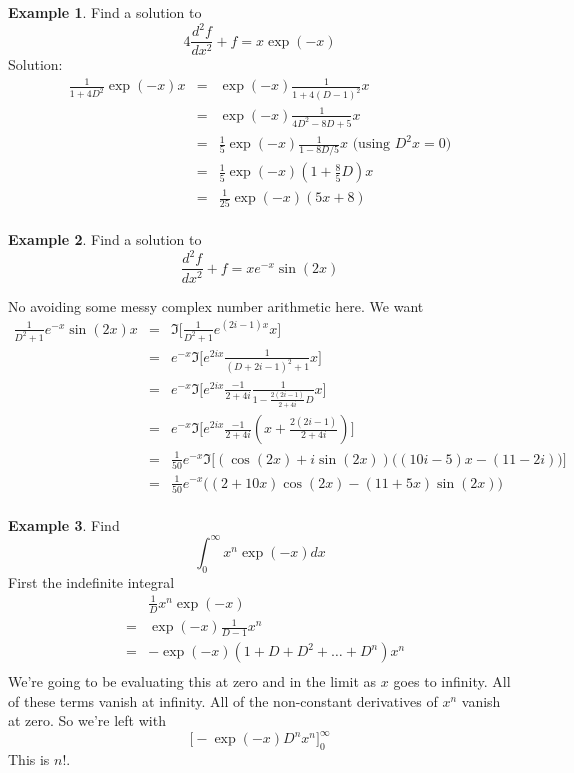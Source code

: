 \documentclass[a4paper]{article}
\theoremstyle{definition}
\newtheorem{example}{Example}[section]
\begin{document}
\begin{example}
Find a solution to
\[
4\frac{d^2f}{dx^2}+f = x\exp(-x)
\]
Solution:
\begin{eqnarray*}
\frac{1}{1+4D^2}\exp(-x)x & = & \exp(-x)\frac{1}{1+4(D-1)^2}x \\
& = & \exp(-x)\frac{1}{4D^2-8D+5}x \\
& = & \frac{1}{5}\exp(-x)\frac{1}{1-8D/5}x \mbox{ (using $D^2x=0$)}\\
& = & \frac{1}{5}\exp(-x)(1+\frac{8}{5}D)x \\
& = & \frac{1}{25}\exp(-x)(5x+8) \\
\end{eqnarray*}
\end{example}

\begin{example}
Find a solution to
\[
\frac{d^2f}{dx^2}+f = x e^{-x}\sin(2x)
\]
\end{example}
No avoiding some messy complex number arithmetic here. We want
\begin{eqnarray*}
\frac{1}{D^2+1}e^{-x}\sin(2x)x
& = & \Im \Big[ \frac{1}{D^2+1}e^{(2i-1)x}x \Big] \\
& = & e^{-x}\Im \Big[ e^{2ix}\frac{1}{(D+2i-1)^2+1}x \Big] \\
& = & e^{-x}\Im \Big[ e^{2ix}\frac{-1}{2+4i}\frac{1}{1-\frac{2(2i-1)}{2+4i}D}x \Big] \\
& = & e^{-x}\Im \Big[ e^{2ix}\frac{-1}{2+4i}(x+\frac{2(2i-1)}{2+4i}) \Big] \\
& = & \frac{1}{50}e^{-x}\Im \Big[ (\cos(2x)+i\sin(2x))\big((10i-5)x-(11-2i)\big) \Big] \\
& = & \frac{1}{50}e^{-x}\big((2+10x)\cos(2x)-(11+5x)\sin(2x)\big) \\
\end{eqnarray*}

\begin{example}
Find
\[
\int_0^\infty x^n\exp(-x)dx
\]
First the indefinite integral
\begin{eqnarray*}
&   & \frac{1}{D}x^n\exp(-x) \\
& = & \exp(-x)\frac{1}{D-1}x^n \\
& = & -\exp(-x)(1+D+D^2+\ldots+D^n)x^n \\
\end{eqnarray*}
We're going to be evaluating this at zero and in the limit as $x$ goes to infinity.
All of these terms vanish at infinity.
All of the non-constant derivatives of $x^n$ vanish at zero.
So we're left with
\[
\Big[-\exp(-x)D^nx^n\Big]_0^\infty
\]
This is $n!$.
\end{example}
\end{document}
